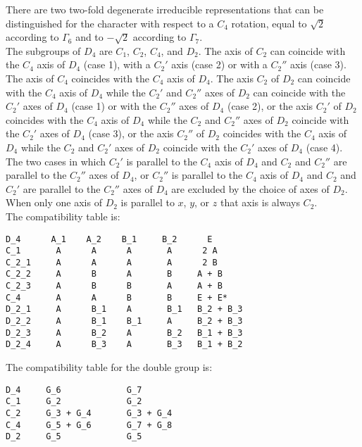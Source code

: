 \documentclass[12pt,a4paper]{article}
\begin{document}
There are two two-fold degenerate irreducible representations that can be 
distinguished for the character with respect to a $C_4$ rotation, equal
to $\sqrt{2}$ according to $\Gamma_6$ and to $-\sqrt{2}$ according to $\Gamma_7$. \\
The subgroups of $D_4$ are $C_1$, $C_2$, $C_4$, and $D_2$. 
The axis of $C_2$ can coincide with the $C_4$ axis of $D_4$ (case 1), 
with a $C_2'$ axis (case 2) or with a $C_2''$ axis (case 3). 
The axis of $C_4$ coincides with the $C_4$ axis of $D_4$.
The axis $C_2$ of $D_2$ can coincide with the $C_4$ axis
of $D_4$ while the $C_2'$ and $C_2''$ axes of $D_2$ can coincide with the $C_2'$
axes of $D_4$ (case 1) or with the $C_2''$ axes of $D_4$ (case 2), 
or the axis $C_2'$ of $D_2$ coincides with the $C_4$ axis
of $D_4$ while the $C_2$ and $C_2''$ axes of $D_2$ coincide with the $C_2'$
axes of $D_4$ (case 3), or the axis $C_2''$ of $D_2$ coincides with the $C_4$ axis
of $D_4$ while the $C_2$ and $C_2'$ axes of $D_2$ coincide with the $C_2'$
axes of $D_4$ (case 4). The two cases in which $C_2'$ is parallel to the
$C_4$ axis of $D_4$ and $C_2$ and $C_2''$ are parallel to the $C_2''$ axes of
$D_4$, or $C_2''$ is parallel to the $C_4$ axis of $D_4$ and
$C_2$ and $C_2'$ are parallel to the $C_2''$ axes of $D_4$ are 
excluded by the choice of axes of $D_2$. When only one axis of $D_2$
is parallel to $x$, $y$, or $z$ that axis is always $C_2$. \\
The compatibility table is:
\begin{verbatim}
D_4      A_1    A_2    B_1     B_2      E
C_1       A      A      A       A      2 A
C_2_1     A      A      A       A      2 B
C_2_2     A      B      A       B     A + B
C_2_3     A      B      B       A     A + B
C_4       A      A      B       B     E + E*      
D_2_1     A      B_1    A       B_1   B_2 + B_3
D_2_2     A      B_1    B_1     A     B_2 + B_3
D_2_3     A      B_2    A       B_2   B_1 + B_3
D_2_4     A      B_3    A       B_3   B_1 + B_2
\end{verbatim}
The compatibility table for the double group is:
\begin{verbatim}
D_4     G_6             G_7  
C_1     G_2             G_2   
C_2     G_3 + G_4       G_3 + G_4   
C_4     G_5 + G_6       G_7 + G_8
D_2     G_5             G_5
\end{verbatim}

\newpage
\end{document}
